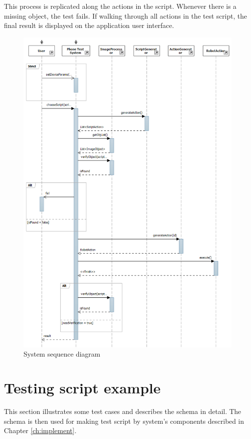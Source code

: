 This process is replicated along the actions in the script. Whenever there is a missing object, the test fails. If walking through all actions in the test script, the final result is displayed on the application user interface.

    \begin{figure}[H]
		\centering
		\includegraphics[scale=0.75]{Chapters/Fig/sequence_diagram.png}
		\caption{System sequence diagram}
		\label{fig:sequence_diagram}
	\end{figure}

\section{Testing script example}
\label{sec:eg_script}
This section illustrates some test cases and describes the schema in detail. The schema is then used for making test script by system's components described in Chapter \ref{ch:implement}.

